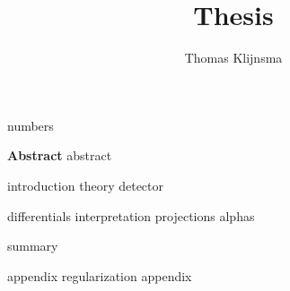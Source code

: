\documentclass[draftmode]{main}
\begin{document}
\title{Thesis}
\author{Thomas Klijnsma}
\maketitle

{numbers}

\textbf{Abstract}
{abstract}

\tableofcontents

{introduction}
{theory}
{detector}

{differentials}
{interpretation}
{projections}
{alphas}

{summary}




\appendix
{appendix}
{regularization}
{appendix}
\end{document}

